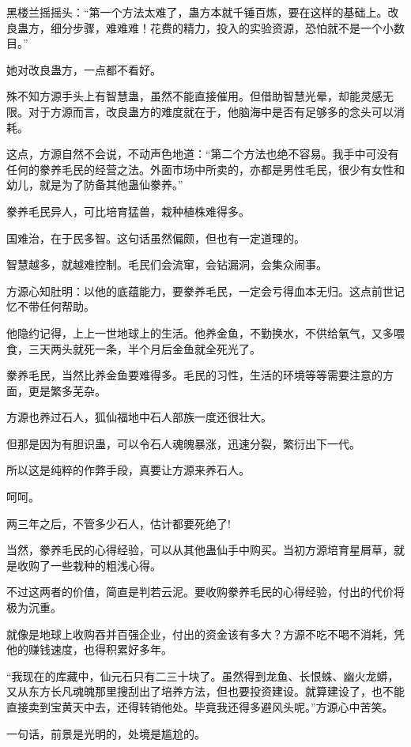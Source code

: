 \begin{this_body}
黑楼兰摇摇头：“第一个方法太难了，蛊方本就千锤百炼，要在这样的基础上。改良蛊方，细分步骤，难难难！花费的精力，投入的实验资源，恐怕就不是一个小数目。”

她对改良蛊方，一点都不看好。

殊不知方源手头上有智慧蛊，虽然不能直接催用。但借助智慧光晕，却能灵感无限。对于方源而言，改良蛊方的难度就在于，他脑海中是否有足够多的念头可以消耗。

这点，方源自然不会说，不动声色地道：“第二个方法也绝不容易。我手中可没有任何的豢养毛民的经营之法。外面市场中所卖的，亦都是男性毛民，很少有女性和幼儿，就是为了防备其他蛊仙豢养。”

豢养毛民异人，可比培育猛兽，栽种植株难得多。

国难治，在于民多智。这句话虽然偏颇，但也有一定道理的。

智慧越多，就越难控制。毛民们会流窜，会钻漏洞，会集众闹事。

方源心知肚明：以他的底蕴能力，要豢养毛民，一定会亏得血本无归。这点前世记忆不带任何帮助。

他隐约记得，上上一世地球上的生活。他养金鱼，不勤换水，不供给氧气，又多喂食，三天两头就死一条，半个月后金鱼就全死光了。

豢养毛民，当然比养金鱼要难得多。毛民的习性，生活的环境等等需要注意的方面，更是繁多芜杂。

方源也养过石人，狐仙福地中石人部族一度还很壮大。

但那是因为有胆识蛊，可以令石人魂魄暴涨，迅速分裂，繁衍出下一代。

所以这是纯粹的作弊手段，真要让方源来养石人。

呵呵。

两三年之后，不管多少石人，估计都要死绝了!

当然，豢养毛民的心得经验，可以从其他蛊仙手中购买。当初方源培育星屑草，就是收购了一些栽种的粗浅心得。

不过这两者的价值，简直是判若云泥。要收购豢养毛民的心得经验，付出的代价将极为沉重。

就像是地球上收购吞并百强企业，付出的资金该有多大？方源不吃不喝不消耗，凭他的赚钱速度，也得积累好多年。

“我现在的库藏中，仙元石只有二三十块了。虽然得到龙鱼、长恨蛛、幽火龙蟒，又从东方长凡魂魄那里搜刮出了培养方法，但也要投资建设。就算建设了，也不能直接卖到宝黄天中去，还得转销他处。毕竟我还得多避风头呢。”方源心中苦笑。

一句话，前景是光明的，处境是尴尬的。


\end{this_body}
